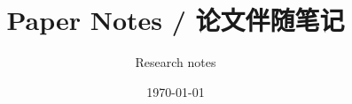 \documentclass[11pt,a4paper,fontset=fandol]{ctexart}
\title{Paper Notes / 论文伴随笔记}
\author{Research notes}
\date{\today}
\begin{document}
\maketitle
\tableofcontents
\clearpage

\clearpage
\PrintNoteTypeIndex
\end{document}
